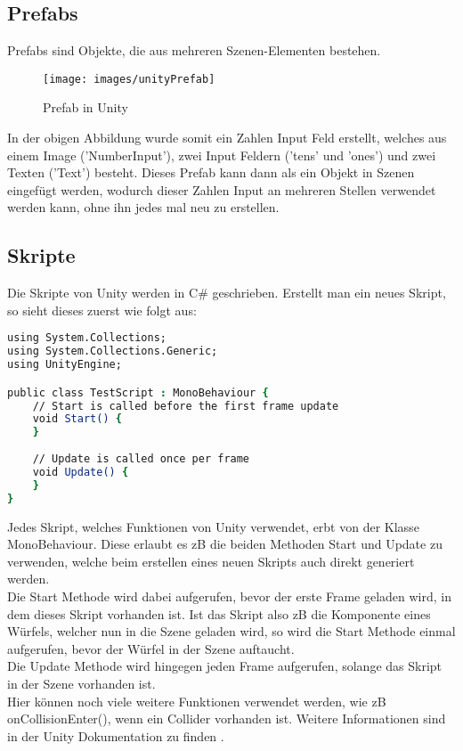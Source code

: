 \subsection{Prefabs}
\label{sub:prefab}
Prefabs sind Objekte, die aus mehreren Szenen-Elementen bestehen.
\begin{figure}[htbp]
  \centering
  \texttt{[image: images/unityPrefab]}
  \caption{Prefab in Unity}
  \label{fig:unityPrefab}
\end{figure}
In der obigen Abbildung wurde somit ein Zahlen Input Feld erstellt, welches aus einem Image ('NumberInput'), zwei Input Feldern ('tens' und 'ones') und zwei Texten ('Text') besteht. Dieses Prefab kann dann als ein Objekt in Szenen eingefügt werden, wodurch dieser Zahlen Input an mehreren Stellen verwendet werden kann, ohne ihn jedes mal neu zu erstellen.

\subsection{Skripte}
\label{sub:skripte}
Die Skripte von Unity werden in C\# geschrieben. Erstellt man ein neues Skript, so sieht dieses zuerst wie folgt aus:
\begin{lstlisting}[language=csh, caption={Generiertes Unity Skript}]
using System.Collections;
using System.Collections.Generic;
using UnityEngine;

public class TestScript : MonoBehaviour {
    // Start is called before the first frame update
    void Start() {
    }
	
	// Update is called once per frame
    void Update() {
    }
}
\end{lstlisting}
Jedes Skript, welches Funktionen von Unity verwendet, erbt von der Klasse MonoBehaviour.
Diese erlaubt es zB die beiden Methoden Start und Update zu verwenden, welche beim erstellen eines neuen Skripts auch direkt generiert werden.\\
Die Start Methode wird dabei aufgerufen, bevor der erste Frame geladen wird, in dem dieses Skript vorhanden ist. Ist das Skript also zB die Komponente eines Würfels, welcher nun in die Szene geladen wird, so wird die Start Methode einmal aufgerufen, bevor der Würfel in der Szene auftaucht.\\
Die Update Methode wird hingegen jeden Frame aufgerufen, solange das Skript in der Szene vorhanden ist. \\

Hier können noch viele weitere Funktionen verwendet werden, wie zB onCollisionEnter(), wenn ein Collider vorhanden ist. Weitere Informationen sind in der Unity Dokumentation zu finden \autocite{Unity:Doc}.

